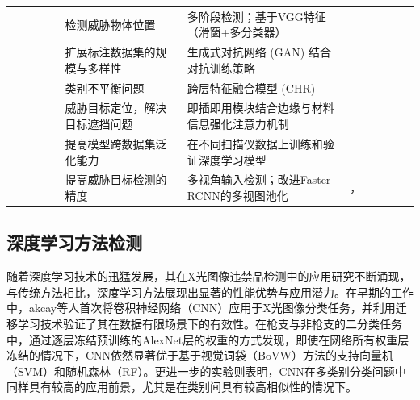 \documentclass[11pt,twocolumn]{ctexart}
\begin{document}
\begin{table}
\begin{tabular*}{\linewidth}{>{\centering\arraybackslash}p{0.13 \linewidth}|%
>{\centering\arraybackslash}p{0.3\linewidth}|%
>{\centering\arraybackslash}p{0.4\linewidth}|%
>{\centering\arraybackslash}p{0.17\linewidth}}
                          & 检测威胁物体位置              & 多阶段检测；基于VGG特征（滑窗+多分类器）                 & \cite{jaccard2017detection, griffin2009basic, bosch2007representing}                                       \\
                          & 扩展标注数据集的规模与多样性        & 生成式对抗网络 (GAN) 结合对抗训练策略                 & \cite{zhao2018gan, yang2019data}                                                                           \\
                          & 类别不平衡问题  & 跨层特征融合模型 (CHR)                         & \cite{miao2019sixray}                                                                                      \\
                          & 威胁目标定位，解决目标遮挡问题       & 即插即用模块结合边缘与材料信息强化注意力机制                 & \cite{wei2020occluded}                                                                                     \\
                          & 提高模型跨数据集泛化能力          & 在不同扫描仪数据上训练和验证深度学习模型                   & \cite{caldwell2017transferring, gaus2019evaluating}                                                        \\
                          & 提高威胁目标检测的精度           & 多视角输入检测；改进Faster RCNN的多视图池化            & \cite{liang2018automatic}，\cite{steitz2018multi}                                                           \\
\hline\hline %
\end{tabular*}
\vspace{1cm} %
\label{X光图像违禁品检测技术概述}
\end{table}

\subsection{深度学习方法检测}
随着深度学习技术的迅猛发展，其在X光图像违禁品检测中的应用研究不断涌现，与传统方法相比，深度学习方法展现出显著的性能优势与应用潜力。在早期的工作中，akcay等人\cite{akccay2016transfer}首次将卷积神经网络（CNN）应用于X光图像分类任务，并利用迁移学习技术验证了其在数据有限场景下的有效性。在枪支与非枪支的二分类任务中，通过逐层冻结预训练的AlexNet层的权重的方式发现，即使在网络所有权重层冻结的情况下，CNN依然显著优于基于视觉词袋（BoVW）方法的支持向量机（SVM）和随机森林（RF）。更进一步的实验则表明，CNN在多类别分类问题中同样具有较高的应用前景，尤其是在类别间具有较高相似性的情况下。
\end{document}
